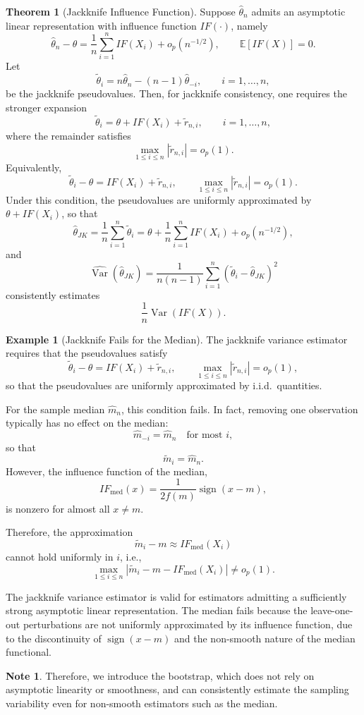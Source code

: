 \documentclass[11pt]{article}
\theoremstyle{definition}
\newtheorem{note}{Note}[section]
\newtheorem{exmp}{Example}[section]
\newtheorem{theo}{Theorem}[section]
\begin{document}
\begin{theo}[Jackknife Influence Function]
    Suppose $\hat\theta_n$ admits an asymptotic linear representation with influence function
$IF(\cdot)$, namely
\[
\hat\theta_n-\theta
=
\frac{1}{n}\sum_{i=1}^n IF(X_i)+o_p(n^{-1/2}),
\qquad
\mathbb{E}[IF(X)]=0.
\]
Let
\[
\tilde\theta_i
=
n\hat\theta_n-(n-1)\hat\theta_{-i},
\qquad i=1,\dots,n,
\]
be the jackknife pseudovalues. Then, for jackknife consistency, one requires the stronger expansion
\[
\tilde\theta_i
=
\theta + IF(X_i) + \tilde r_{n,i},
\qquad i=1,\dots,n,
\]
where the remainder satisfies
\[
\max_{1\le i\le n} |\tilde r_{n,i}| = o_p(1).
\]
Equivalently,
\[
\tilde\theta_i-\theta
=
IF(X_i)+\tilde r_{n,i},
\qquad
\max_{1\le i\le n} |\tilde r_{n,i}| = o_p(1).
\]
Under this condition, the pseudovalues are uniformly approximated by
$\theta+IF(X_i)$, so that
\[
\hat\theta_{JK}
=
\frac{1}{n}\sum_{i=1}^n \tilde\theta_i
=
\theta+\frac{1}{n}\sum_{i=1}^n IF(X_i)+o_p(n^{-1/2}),
\]
and
\[
\widehat{\operatorname{Var}}(\hat\theta_{JK})
=
\frac{1}{n(n-1)}\sum_{i=1}^n (\tilde\theta_i-\hat\theta_{JK})^2
\]
consistently estimates
\[
\frac{1}{n}\operatorname{Var}(IF(X)).
\]
\end{theo}
\begin{exmp}[Jackknife Fails for the Median]

The jackknife variance estimator requires that the pseudovalues satisfy
\[
\tilde{\theta}_i - \theta
=
IF(X_i) + \tilde r_{n,i},
\qquad
\max_{1\le i\le n} |\tilde r_{n,i}| = o_p(1),
\]
so that the pseudovalues are uniformly approximated by i.i.d.\ quantities.

For the sample median $\hat m_n$, this condition fails. In fact, removing one observation
typically has no effect on the median:
\[
\hat m_{-i} = \hat m_n \quad \text{for most } i,
\]
so that
\[
\tilde m_i = \hat m_n.
\]
However, the influence function of the median,
\[
IF_{\mathrm{med}}(x) = \frac{1}{2f(m)} \operatorname{sign}(x - m),
\]
is nonzero for almost all $x \neq m$.

Therefore, the approximation
\[
\tilde m_i - m \approx IF_{\mathrm{med}}(X_i)
\]
cannot hold uniformly in $i$, i.e.,
\[
\max_{1\le i\le n}
\left|
\tilde m_i - m - IF_{\mathrm{med}}(X_i)
\right|
\neq o_p(1).
\]

The jackknife variance estimator is valid for estimators admitting a sufficiently strong asymptotic linear representation. The median fails because the leave-one-out perturbations are not uniformly approximated by its influence function, due to the discontinuity of $\operatorname{sign}(x-m)$ and the non-smooth nature of the median functional.
\end{exmp}
\begin{note}
    Therefore, we introduce the bootstrap, which does not rely on asymptotic linearity or smoothness, and can consistently estimate the sampling variability even for non-smooth estimators such as the median.
\end{note}
\end{document}
